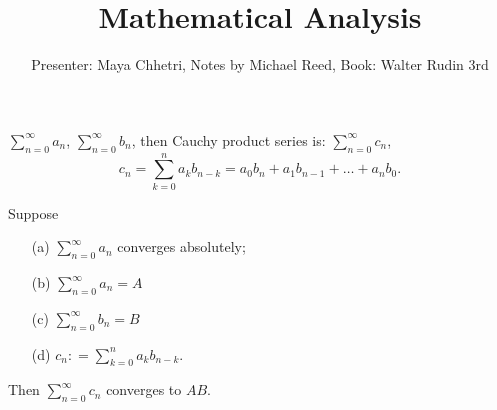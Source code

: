 \documentclass[]{article}
\author{Presenter: Maya Chhetri, Notes by Michael Reed, Book: Walter Rudin 3rd}
\title{Mathematical Analysis}
\begin{document}
\maketitle



\begin{recall}
	 $\sum_{n=0}^\infty a_n$, $\sum_{n=0}^\infty b_n$, then Cauchy product series is:
	$\sum_{n=0}^\infty c_n$, 
	$$c_n = \sum_{k=0}^n a_kb_{n-k} = a_0b_n + a_1b_{n-1} + \dots + a_nb_0.$$
\end{recall}

\begin{theorem}
	\label{thm-3-50}
	Suppose
	\begin{enumerate}
		\item[(a)] $\sum_{n=0}^\infty a_n$ converges absolutely;
		\item[(b)] $\sum_{n=0}^\infty a_n = A$
		\item[(c)] $\sum_{n=0}^\infty b_n = B$
		\item[(d)] $c_n: = \sum_{k=0}^n a_kb_{n-k}$.
	\end{enumerate}
	Then $\sum_{n=0}^\infty c_n$ converges to $AB$.
\end{theorem}
\end{document}
